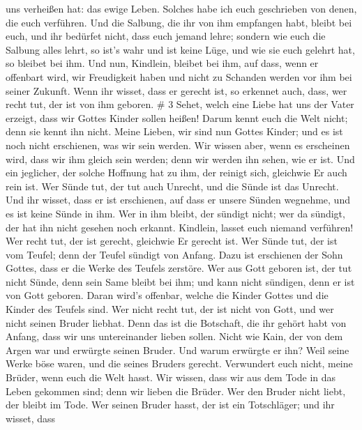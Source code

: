 uns verheißen hat: das ewige Leben.  Solches habe ich euch
geschrieben von denen, die euch verführen.  Und die
Salbung, die ihr von ihm empfangen habt, bleibt bei euch, und ihr
bedürfet nicht, dass euch jemand lehre; sondern wie euch die Salbung
alles lehrt, so ist's wahr und ist keine Lüge, und wie sie euch gelehrt
hat, so bleibet bei ihm.  Und nun, Kindlein, bleibet bei
ihm, auf dass, wenn er offenbart wird, wir Freudigkeit haben und nicht
zu Schanden werden vor ihm bei seiner Zukunft.  Wenn ihr
wisset, dass er gerecht ist, so erkennet auch, dass, wer recht tut, der
ist von ihm geboren. \# 3  Sehet, welch eine Liebe hat uns
der Vater erzeigt, dass wir Gottes Kinder sollen heißen! Darum kennt
euch die Welt nicht; denn sie kennt ihn nicht.  Meine
Lieben, wir sind nun Gottes Kinder; und es ist noch nicht erschienen,
was wir sein werden. Wir wissen aber, wenn es erscheinen wird, dass wir
ihm gleich sein werden; denn wir werden ihn sehen, wie er ist.
 Und ein jeglicher, der solche Hoffnung hat zu ihm, der
reinigt sich, gleichwie Er auch rein ist.  Wer Sünde tut,
der tut auch Unrecht, und die Sünde ist das Unrecht.  Und
ihr wisset, dass er ist erschienen, auf dass er unsere Sünden wegnehme,
und es ist keine Sünde in ihm.  Wer in ihm bleibt, der
sündigt nicht; wer da sündigt, der hat ihn nicht gesehen noch erkannt.
 Kindlein, lasset euch niemand verführen! Wer recht tut, der
ist gerecht, gleichwie Er gerecht ist.  Wer Sünde tut, der
ist vom Teufel; denn der Teufel sündigt von Anfang. Dazu ist erschienen
der Sohn Gottes, dass er die Werke des Teufels zerstöre. 
Wer aus Gott geboren ist, der tut nicht Sünde, denn sein Same bleibt bei
ihm; und kann nicht sündigen, denn er ist von Gott geboren.
 Daran wird's offenbar, welche die Kinder Gottes und die
Kinder des Teufels sind. Wer nicht recht tut, der ist nicht von Gott,
und wer nicht seinen Bruder liebhat.  Denn das ist die
Botschaft, die ihr gehört habt von Anfang, dass wir uns untereinander
lieben sollen.  Nicht wie Kain, der von dem Argen war und
erwürgte seinen Bruder. Und warum erwürgte er ihn? Weil seine Werke böse
waren, und die seines Bruders gerecht.  Verwundert euch
nicht, meine Brüder, wenn euch die Welt hasst.  Wir wissen,
dass wir aus dem Tode in das Leben gekommen sind; denn wir lieben die
Brüder. Wer den Bruder nicht liebt, der bleibt im Tode. 
Wer seinen Bruder hasst, der ist ein Totschläger; und ihr wisset, dass
